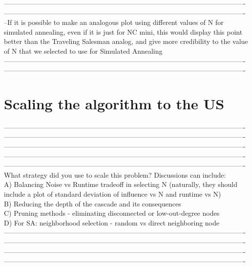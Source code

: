 \documentclass[11pt]{scrartcl} %
\begin{document}
\begin{enumerate}
----------------------------------------------------------------------------------------------------------\\
----------------------------------------------------------------------------------------------------------\\
--If it is possible to make an analogous plot using different values of N for simulated annealing, even if it is just for NC mini, this would display this point better than the Traveling Salesman analog, and give more credibility to the value of N that we selected to use for Simulated Annealing\\
----------------------------------------------------------------------------------------------------------\\
----------------------------------------------------------------------------------------------------------\\

\end{enumerate}

\section{Scaling the algorithm to the US}
----------------------------------------------------------------------------------------------------------\\
----------------------------------------------------------------------------------------------------------\\
----------------------------------------------------------------------------------------------------------\\
----------------------------------------------------------------------------------------------------------\\
----------------------------------------------------------------------------------------------------------\\
 What strategy did you use to scale this problem?  Discussions can include:\\
 A) Balancing Noise vs Runtime tradeoff in selecting N (naturally, they should include a plot of standard deviation of influence vs N and runtime vs N)\\
 B) Reducing the depth of the cascade and its consequences\\
 C) Pruning methods - eliminating disconnected or low-out-degree nodes\\
 D) For SA: neighborhood selection - random vs direct neighboring node\\
----------------------------------------------------------------------------------------------------------\\
----------------------------------------------------------------------------------------------------------\\
----------------------------------------------------------------------------------------------------------\\
----------------------------------------------------------------------------------------------------------\\
\\
\\
\end{document}

